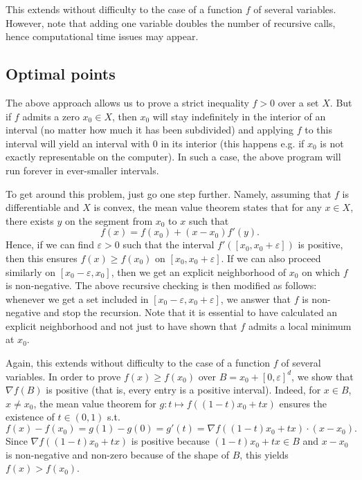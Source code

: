 \documentclass[11pt]{article}
\begin{document}
This extends without difficulty to the case of a function $f$ of several variables.
However, note that adding one variable doubles the number of recursive calls, hence computational time issues may appear.

\subsection{Optimal points}

The above approach allows us to prove a strict inequality $f>0$ over a set $X$.
But if $f$ admits a zero $x_0\in X$, then $x_0$ will stay indefinitely in the interior of an interval (no matter how much it has been subdivided) and applying $f$ to this interval will yield an interval with $0$ in its interior (this happens e.g. if $x_0$ is not exactly representable on the computer).
In such a case, the above program will run forever in ever-smaller intervals.

To get around this problem, just go one step further.
Namely, assuming that $f$ is differentiable and $X$ is convex, the mean value theorem states that for any $x\in X$, there exists $y$ on the segment from $x_0$ to $x$ such that
\[
f(x)=f(x_0)+(x-x_0)f'(y).
\]
Hence, if we can find $\varepsilon>0$ such that the interval $f'([x_0,x_0+\varepsilon])$ is positive, then this ensures $f(x)\geq f(x_0)$ on $[x_0,x_0+\varepsilon]$.
If we can also proceed similarly on $[x_0-\varepsilon,x_0]$, then we get an explicit neighborhood of $x_0$ on which $f$ is non-negative.
The above recursive checking is then modified as follows: whenever we get a set included in $[x_0-\varepsilon,x_0+\varepsilon]$, we answer that $f$ is non-negative and stop the recursion.
Note that it is essential to have calculated an explicit neighborhood and not just to have shown that $f$ admits a local minimum at $x_0$.

Again, this extends without difficulty to the case of a function $f$ of several variables.
In order to prove $f(x)\geq f(x_0)$ over $B=x_0+[0,\varepsilon]^d$,
we show that $\nabla f(B)$ is positive (that is, every entry is a positive interval).
Indeed, for $x\in B$, $x\neq x_0$, the mean value theorem for $g:t\mapsto f((1-t)x_0+tx)$ ensures the existence of $t\in(0,1)$ s.t.
\[
f(x)-f(x_0)=g(1)-g(0)=g'(t)=\nabla f((1-t)x_0+tx)\cdotp (x-x_0).
\]
Since $\nabla f((1-t)x_0+tx)$ is positive because $(1-t)x_0+tx\in B$ and $x-x_0$ is non-negative and non-zero because of the shape of $B$, this yields $f(x)>f(x_0)$.
\end{document}
